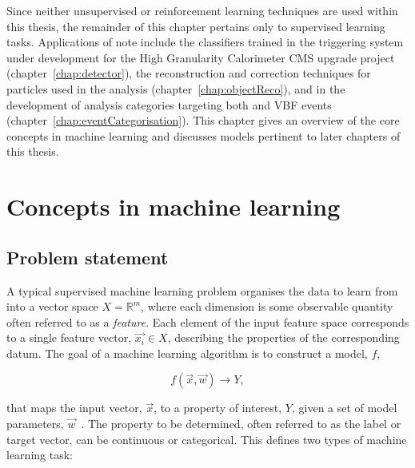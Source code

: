 Since neither unsupervised or reinforcement learning techniques are used within this thesis, the remainder of this chapter pertains only to supervised learning tasks. Applications of note include the classifiers trained in the triggering system under development for the High Granularity Calorimeter CMS upgrade project (chapter~\ref{chap:detector}), the reconstruction and correction techniques for particles used in the \Hee analysis (chapter~\ref{chap:objectReco}), and in the development of analysis categories targeting both \ggH and VBF \Hee events (chapter~\ref{chap:eventCategorisation}). This chapter gives an overview of the core concepts in machine learning and discusses models pertinent to later chapters of this thesis. 

\section{Concepts in machine learning}

\subsection{Problem statement}

A typical supervised machine learning problem organises the data to learn from into a vector space $X=\mathbb{R}^{m}$, where each dimension is some observable quantity often referred to as a \textit{feature}. Each element of the input feature space corresponds to a single feature vector, $\vec{x_{i}}\in X$, describing the properties of the corresponding datum. The goal of a machine learning algorithm is to construct a model, $f$, %

$$f(\vec{x},\vec{w})\rightarrow Y,$$

\noindent that maps the input vector, $\vec{x}$, to a property of interest, $Y$, given a set of model parameters, $\vec{w}$~\cite{statistical_learning}. The property to be determined, often referred to as the label or target vector, can be continuous or categorical. This defines two types of machine learning task:

